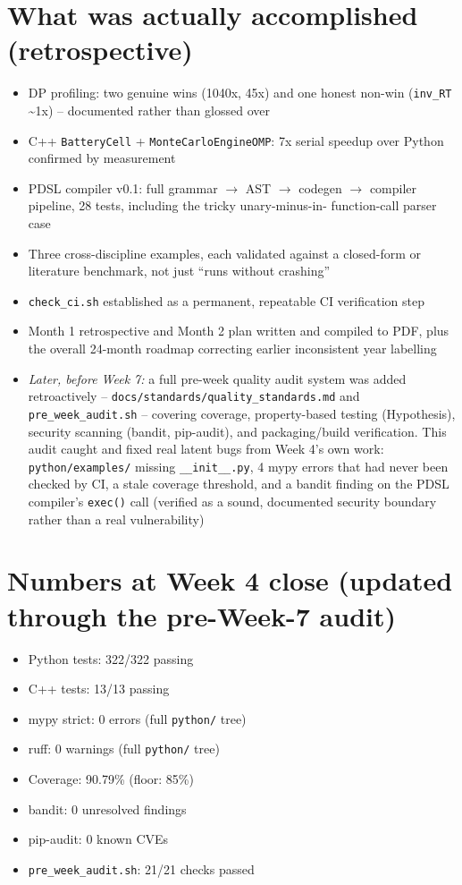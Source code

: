 \documentclass[11pt]{article}
\begin{document}
\section*{What was actually accomplished (retrospective)}

\begin{itemize}[leftmargin=*]
  \item DP profiling: two genuine wins (1040x, 45x) and one honest
    non-win (\texttt{inv\_RT} \textasciitilde{}1x) -- documented
    rather than glossed over
  \item C++ \texttt{BatteryCell} + \texttt{MonteCarloEngineOMP}: 7x
    serial speedup over Python confirmed by measurement
  \item PDSL compiler v0.1: full grammar $\to$ AST $\to$ codegen $\to$
    compiler pipeline, 28 tests, including the tricky unary-minus-in-
    function-call parser case
  \item Three cross-discipline examples, each validated against a
    closed-form or literature benchmark, not just ``runs without
    crashing''
  \item \texttt{check\_ci.sh} established as a permanent, repeatable
    CI verification step
  \item Month 1 retrospective and Month 2 plan written and compiled to
    PDF, plus the overall 24-month roadmap correcting earlier
    inconsistent year labelling
  \item \emph{Later, before Week 7:} a full pre-week quality audit
    system was added retroactively --
    \texttt{docs/standards/quality\_standards.md} and
    \texttt{pre\_week\_audit.sh} -- covering coverage, property-based
    testing (Hypothesis), security scanning (bandit, pip-audit), and
    packaging/build verification. This audit caught and fixed real
    latent bugs from Week 4's own work: \texttt{python/examples/}
    missing \texttt{\_\_init\_\_.py}, 4 mypy errors that had never been
    checked by CI, a stale coverage threshold, and a bandit finding on
    the PDSL compiler's \texttt{exec()} call (verified as a sound,
    documented security boundary rather than a real vulnerability)
\end{itemize}

\section*{Numbers at Week 4 close (updated through the pre-Week-7 audit)}
\begin{itemize}[leftmargin=*]
  \item Python tests: 322/322 passing
  \item C++ tests: 13/13 passing
  \item mypy strict: 0 errors (full \texttt{python/} tree)
  \item ruff: 0 warnings (full \texttt{python/} tree)
  \item Coverage: 90.79\% (floor: 85\%)
  \item bandit: 0 unresolved findings
  \item pip-audit: 0 known CVEs
  \item \texttt{pre\_week\_audit.sh}: 21/21 checks passed
\end{itemize}
\end{document}
